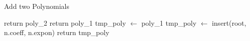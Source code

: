 \begin{algorithm}[H]
    \caption{Add two Polynomials} \label{add}
\begin{algorithmic}
        \State return poly\_2
    \EndIf
        \State return poly\_1
    \EndIf
    \State tmp\_poly $\gets$ poly\_1
    \State tmp\_poly $\gets$ insert(root, n.coeff, n.expon)
    \EndFor
    \State return tmp\_poly
    \EndProcedure
\end{algorithmic}

\end{algorithm}